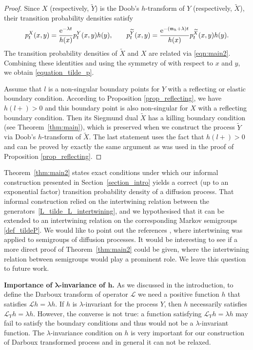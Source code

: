 \documentclass[10pt,a4paper]{amsart}
\numberwithin{equation}{section}
\theoremstyle{definition}
\def\L{{\mathcal L}}
\begin{document}
\begin{proof}
Since $X$ \big(respectively, $\widetilde Y$\big) is the Doob's $h$-transform of $Y$ \big(respectively, $\widetilde X$\big), their transition probability densities satisfy
\begin{align*}
 p^X_t(x,y)=\frac{{\rm e}^{-\lambda t}}{h(x)}p_t^Y(x,y) h(y), \qquad
 p^{\widetilde Y}_t(x,y)=\frac{{\rm e}^{-({\mathfrak m}_h + \lambda) t}}{h(x)}p_t^{\widetilde X}(x,y) h(y).
\end{align*}
The transition probability densities of $\widetilde X$ and $X$ are related via \eqref{eqn:main2}. Combining these identities and using the symmetry of  with respect to $x$ and $y$, we obtain \eqref{equation_tilde_p}.

Assume that $l$ is a non-singular boundary points for $Y$ with a reflecting or elastic boundary condition. According to Proposition
\ref{prop_reflecting}, we have $h(l+)>0$ and this boundary point is also non-singular for $X$ with a reflecting boundary condition. Then its Siegmund dual $\widetilde X$ has a killing boundary condition (see Theorem~\ref{thm:main}), which is preserved when we construct the process $\widetilde Y$ via Doob's $h$-transform of $\widetilde X$. The last statement uses the fact that $h(l+)>0$ and can be proved by exactly the same argument as was used in the proof of Proposition \ref{prop_reflecting}.
\end{proof}


Theorem~\ref{thm:main2} states exact conditions under which our informal construction presented in Section~\ref{section_intro} yields a correct (up to an exponential factor) transition probability density of a diffusion process. That informal construction relied on the intertwining relation between the generators~\eqref{L_tilde_L_intertwining}, and we hypothesised that it can be extended to an intertwining relation on the corresponding Markov semigroups \eqref{def_tildeP}. We would like to point out the references
\cite{Bonnefont_2014,Fill_2016,Patie_2019}, where intertwining was applied to semigroups of diffusion processes. It would be interesting to see if a more direct proof of Theorem~\ref{thm:main2} could be given, where the intertwining relation between semigroups would play a prominent role. We leave this question to future work.


{\bf Importance of $\boldsymbol{\lambda}$-invariance of $\boldsymbol{h}$.}
 As we discussed in the introduction, to define the Darboux transform of operator $\L$ we need a positive function $h$ that satisfies $\L h=\lambda h$. If $h$ is $\lambda$-invariant for the process $Y$, then $h$ necessarily satisfies $\L_Y h=\lambda h$. However, the converse is not true: a function satisfying $\L_Y h=\lambda h$ may fail to satisfy the boundary conditions and thus would not be a $\lambda$-invariant function. The $\lambda$-invariance condition on $h$ is very important for our construction of Darboux transformed process and in general it can not be relaxed.
\end{document}
